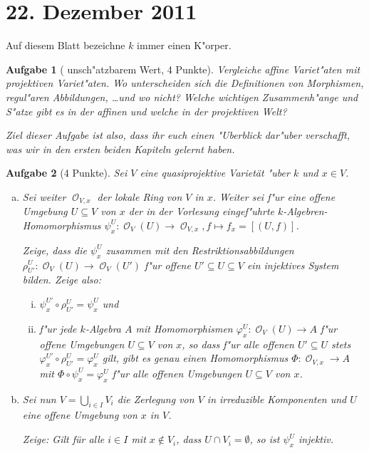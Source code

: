 \documentclass[a4paper, 12pt, numbers=noendperiod, chapterprefix=true]{scrbook}
\theoremstyle{break}
\newtheorem{Aufg}{Aufgabe}
\theoremstyle{nonumberbreak}
\theoremstyle{nonumberplain}
\newcommand{\A}{\mathbb{A}}
\DeclareMathOperator{\Reg}{\mathcal{O}} %
\begin{document}
\newpage
\section{22. Dezember 2011}
\setcounter{Aufg}{0}
\setcounter{Loes}{0}

Auf diesem Blatt bezeichne $k$ immer einen K"orper.

\begin{Aufg}[ unsch"atzbarem Wert, 4 Punkte]
Vergleiche affine Variet"aten mit projektiven Variet"aten. Wo unterscheiden sich die Definitionen von Morphismen, regul"aren Abbildungen, \dots und wo nicht? Welche wichtigen Zusammenh"ange und S"atze gibt es in der affinen und welche in der projektiven Welt?

Ziel dieser Aufgabe ist also, dass ihr euch einen "Uberblick dar"uber verschafft, was wir in den ersten beiden Kapiteln gelernt haben.
\end{Aufg}

\begin{Aufg}[4 Punkte]
Sei $V$ eine quasiprojektive Variet\"at "uber $k$ und $x \in V$.
\begin{enumerate}[a)]
	\item Sei weiter $\Reg_{V,x}$ der lokale Ring von $V$ in $x$. Weiter sei f"ur eine offene Umgebung $U \subseteq V$ von $x$ der in der Vorlesung eingef"uhrte $k$-Algebren-Homomorphismus $\psi_x^U: \Reg_V(U) \to \Reg_{V,x}, f \mapsto f_x=[(U,f)]$.  
 
	Zeige, dass die $\psi_x^U$ zusammen mit den Restriktionsabbildungen $\rho^U_{U'}: \Reg_V(U) \to \Reg_V(U')$ f"ur offene $U' \subseteq U \subseteq V$ ein injektives System bilden. Zeige also:
	\begin{enumerate}[i)]
		\item $\psi_x^{U'} \circ \rho^U_{U'} = \psi_x^U$ und
		\item f"ur jede $k$-Algebra $A$ mit Homomorphismen $\varphi_x^U : \Reg_V(U) \to A$ f"ur offene Umgebungen $U \subseteq V$ von $x$, so dass f"ur alle offenen $U' \subseteq U$ stets $\varphi_x^{U'} \circ \rho^U_{U'} = \varphi_x^U$ gilt, gibt es genau einen Homomorphismus $\Phi : \Reg_{V,x} \to A$ mit $\Phi \circ \psi_x^U = \varphi_x^U$ f"ur alle offenen Umgebungen $U \subseteq V$ von $x$.
	\end{enumerate}
	\item Sei nun $V = \bigcup_{i \in I} V_i$ die Zerlegung von $V$ in irreduzible Komponenten und $U$ eine offene Umgebung von $x$ in $V$. 

	Zeige: Gilt für alle $i \in I$ mit $x \notin V_i$, dass $U \cap V_i = \emptyset$, so ist $\psi^U_x$ injektiv.
\end{enumerate}\end{Aufg}
\end{document}
